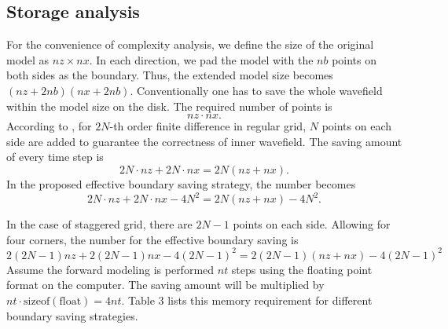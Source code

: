 

\subsection{Storage analysis}

For the convenience of complexity analysis, we define the size of the original model as $nz\times nx$. In each direction, we pad the model with the $nb$ points on both sides as the boundary. Thus, the extended model size becomes $(nz+2nb)(nx+2nb)$. Conventionally one has to save the whole wavefield within the model size on the disk. The required number of points is
\begin{equation}
 nz\cdot nx.
\end{equation}
According to \cite{dussaud2008computational}, for $2N$-th order finite difference in regular grid,  $N$ points on each side are added to guarantee the correctness of inner wavefield. The saving amount of every time step is
\begin{equation}
 2N\cdot nz+2N\cdot nx=2N(nz+nx).
\end{equation}
In the proposed effective boundary saving strategy, the number becomes
\begin{equation}
 2N\cdot nz+2N\cdot nx-4N^2=2N(nz+nx)-4N^2.
\end{equation}


In the case of staggered grid, there are $2N-1$ points on each side. Allowing for four corners, the number for the effective boundary saving is
\begin{equation}
2(2N-1)nz+2(2N-1)nx-4(2N-1)^2=2(2N-1)(nz+nx)-4(2N-1)^2
\end{equation}
Assume the forward modeling is performed $nt$ steps using the floating point format on the computer. The saving amount will be multiplied by $nt\cdot \mathrm{sizeof(float)}=4nt$. Table 3 lists this memory requirement for different boundary saving strategies.


